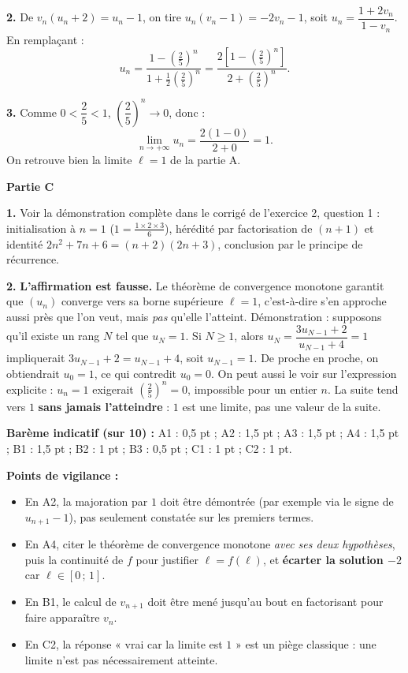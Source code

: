 \documentclass[11pt]{article}
\begin{document}
\begin{corrige}
\textbf{2.} De $v_n(u_n + 2) = u_n - 1$, on tire $u_n(v_n - 1) = -2v_n - 1$, soit $u_n = \dfrac{1 + 2v_n}{1 - v_n}$. En remplaçant :
\[ u_n = \frac{1 - \left(\frac{2}{5}\right)^n}{1 + \frac{1}{2}\left(\frac{2}{5}\right)^n} = \frac{2\left[1 - \left(\frac{2}{5}\right)^n\right]}{2 + \left(\frac{2}{5}\right)^n}. \]

\textbf{3.} Comme $0 < \dfrac{2}{5} < 1$, $\left(\dfrac{2}{5}\right)^n \to 0$, donc :
\[ \lim_{n \to +\infty} u_n = \frac{2(1 - 0)}{2 + 0} = 1. \]
On retrouve bien la limite $\ell = 1$ de la partie A.

\textbf{Partie C}

\textbf{1.} Voir la démonstration complète dans le corrigé de l'exercice 2, question 1 : initialisation à $n = 1$ ($1 = \frac{1 \times 2 \times 3}{6}$), hérédité par factorisation de $(n+1)$ et identité $2n^2 + 7n + 6 = (n+2)(2n+3)$, conclusion par le principe de récurrence.

\textbf{2.} \textbf{L'affirmation est fausse.} Le théorème de convergence monotone garantit que $(u_n)$ converge vers sa borne supérieure $\ell = 1$, c'est-à-dire s'en approche aussi près que l'on veut, mais \emph{pas} qu'elle l'atteint. Démonstration : supposons qu'il existe un rang $N$ tel que $u_N = 1$. Si $N \geq 1$, alors $u_N = \dfrac{3u_{N-1} + 2}{u_{N-1} + 4} = 1$ impliquerait $3u_{N-1} + 2 = u_{N-1} + 4$, soit $u_{N-1} = 1$. De proche en proche, on obtiendrait $u_0 = 1$, ce qui contredit $u_0 = 0$. On peut aussi le voir sur l'expression explicite : $u_n = 1$ exigerait $\left(\frac{2}{5}\right)^n = 0$, impossible pour un entier $n$. La suite tend vers $1$ \textbf{sans jamais l'atteindre} : $1$ est une limite, pas une valeur de la suite.

\textbf{Barème indicatif (sur 10) :} A1 : 0,5 pt ; A2 : 1,5 pt ; A3 : 1,5 pt ; A4 : 1,5 pt ; B1 : 1,5 pt ; B2 : 1 pt ; B3 : 0,5 pt ; C1 : 1 pt ; C2 : 1 pt.

\textbf{Points de vigilance :}
\begin{itemize}
\item En A2, la majoration par $1$ doit être démontrée (par exemple via le signe de $u_{n+1} - 1$), pas seulement constatée sur les premiers termes.
\item En A4, citer le théorème de convergence monotone \emph{avec ses deux hypothèses}, puis la continuité de $f$ pour justifier $\ell = f(\ell)$, et \textbf{écarter la solution $-2$} car $\ell \in [0\,;\,1]$.
\item En B1, le calcul de $v_{n+1}$ doit être mené jusqu'au bout en factorisant pour faire apparaître $v_n$.
\item En C2, la réponse « vrai car la limite est $1$ » est un piège classique : une limite n'est pas nécessairement atteinte.
\end{itemize}
\end{corrige}
\end{document}
